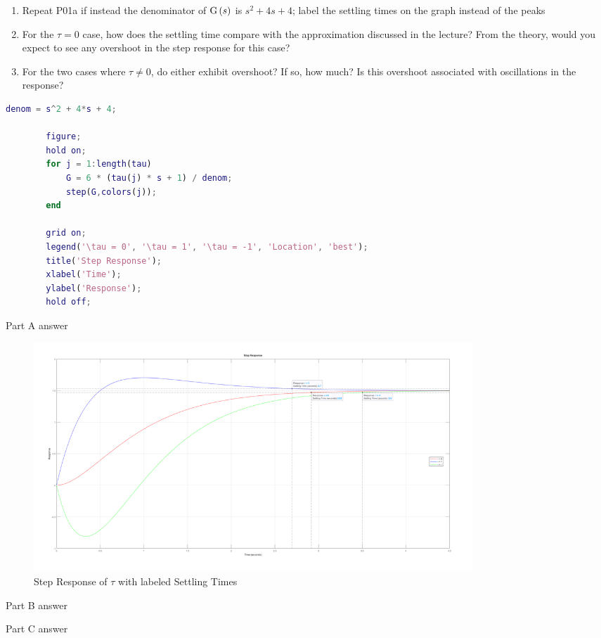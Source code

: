 \begin{hwkProblem}{2}{}

	\begin{enumerate}
		\item Repeat P01a if instead the denominator of \( \func{G}[s] \) is \( s^{2}+4s+4 \); label the settling times on the graph instead of the peaks
		\item For the \( \tau = 0 \) case, how does the settling time compare with the approximation discussed in the lecture? From the theory, would you expect to see any overshoot in the step response for this case?
		\item For the two cases where \( \tau \neq 0 \), do either exhibit overshoot? If so, how much? Is this overshoot associated with oscillations in the response?
	\end{enumerate}

	\hwkSol{}

	\begin{lstlisting}[language={matlab}, label={lst:s02}, caption={MATLAB code for HW05 P02}]
		denom = s^2 + 4*s + 4;

		figure;
		hold on;
		for j = 1:length(tau)
			G = 6 * (tau(j) * s + 1) / denom;
			step(G,colors(j));
		end

		grid on;
		legend('\tau = 0', '\tau = 1', '\tau = -1', 'Location', 'best');
		title('Step Response');
		xlabel('Time');
		ylabel('Response');
		hold off;
	\end{lstlisting}

	\hwkPart{}

	Part A answer

	\begin{figure}[H]
		\begin{center}
			\includegraphics[width=0.8\textwidth]{./images/s02a.png}
		\end{center}
		\caption{Step Response of \( \tau \) with labeled Settling Times}\label{fig:s02a}
	\end{figure}

	\hwkPart{}
	
	Part B answer

	\hwkPart{}

	Part C answer

\end{hwkProblem}

